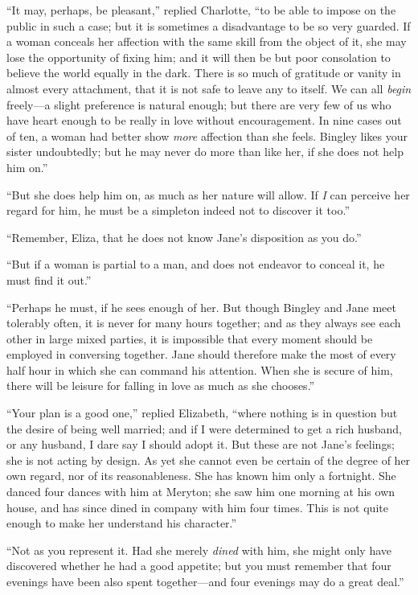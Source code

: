 \documentclass[12pt,openright]{book}
\begin{document}
“It may, perhaps, be pleasant,” replied Charlotte, “to be able to impose on the public in such a case; but it is sometimes a disadvantage to be so very guarded. If a woman conceals her affection with the same skill from the object of it, she may lose the opportunity of fixing him; and it will then be but poor consolation to believe the world equally in the dark. There is so much of gratitude or vanity in almost every attachment, that it is not safe to leave any to itself. We can all \textit{begin} freely—a slight preference is natural enough; but there are very few of us who have heart enough to be really in love without encouragement. In nine cases out of ten, a woman had better show \textit{more} affection than she feels. Bingley likes your sister undoubtedly; but he may never do more than like her, if she does not help him on.”

“But she does help him on, as much as her nature will allow. If \textit{I} can perceive her regard for him, he must be a simpleton indeed not to discover it too.”

“Remember, Eliza, that he does not know Jane’s disposition as you do.”

“But if a woman is partial to a man, and does not endeavor to conceal it, he must find it out.”

“Perhaps he must, if he sees enough of her. But though Bingley and Jane meet tolerably often, it is never for many hours together; and as they always see each other in large mixed parties, it is impossible that every moment should be employed in conversing together. Jane should therefore make the most of every half hour in which she can command his attention. When she is secure of him, there will be leisure for falling in love as much as she chooses.”

“Your plan is a good one,” replied Elizabeth, “where nothing is in question but the desire of being well married; and if I were determined to get a rich husband, or any husband, I dare say I should adopt it. But these are not Jane’s feelings; she is not acting by design. As yet she cannot even be certain of the degree of her own regard, nor of its reasonableness. She has known him only a fortnight. She danced four dances with him at Meryton; she saw him one morning at his own house, and has since dined in company with him four times. This is not quite enough to make her understand his character.”

“Not as you represent it. Had she merely \textit{dined} with him, she might only have discovered whether he had a good appetite; but you must remember that four evenings have been also spent together—and four evenings may do a great deal.”
\end{document}
